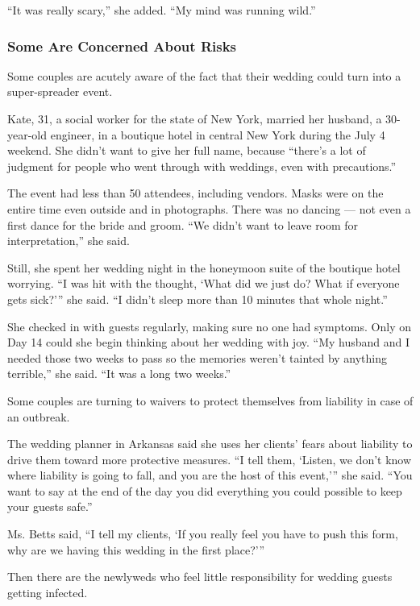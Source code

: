 ``It was really scary,'' she added. ``My mind was running wild.''

\hypertarget{some-are-concerned-about-risks}{%
\subsubsection{Some Are Concerned About
Risks}\label{some-are-concerned-about-risks}}

Some couples are acutely aware of the fact that their wedding could turn
into a super-spreader event.

Kate, 31, a social worker for the state of New York, married her
husband, a 30-year-old engineer, in a boutique hotel in central New York
during the July 4 weekend. She didn't want to give her full name,
because ``there's a lot of judgment for people who went through with
weddings, even with precautions.''

The event had less than 50 attendees, including vendors. Masks were on
the entire time even outside and in photographs. There was no dancing
--- not even a first dance for the bride and groom. ``We didn't want to
leave room for interpretation,'' she said.

Still, she spent her wedding night in the honeymoon suite of the
boutique hotel worrying. ``I was hit with the thought, `What did we just
do? What if everyone gets sick?''' she said. ``I didn't sleep more than
10 minutes that whole night.''

She checked in with guests regularly, making sure no one had symptoms.
Only on Day 14 could she begin thinking about her wedding with joy. ``My
husband and I needed those two weeks to pass so the memories weren't
tainted by anything terrible,'' she said. ``It was a long two weeks.''

Some couples are turning to waivers to protect themselves from liability
in case of an outbreak.

The wedding planner in Arkansas said she uses her clients' fears about
liability to drive them toward more protective measures. ``I tell them,
`Listen, we don't know where liability is going to fall, and you are the
host of this event,''' she said. ``You want to say at the end of the day
you did everything you could possible to keep your guests safe.''

Ms. Betts said, ``I tell my clients, `If you really feel you have to
push this form, why are we having this wedding in the first place?'''

Then there are the newlyweds who feel little responsibility for wedding
guests getting infected.

